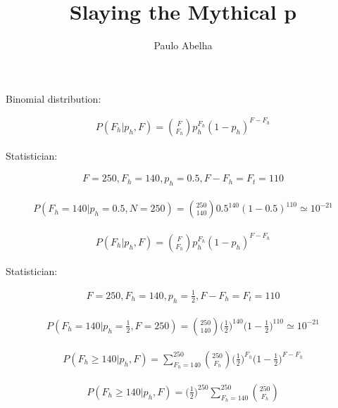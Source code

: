 \documentclass[12pt]{article}
\begin{document}
 

\pagecolor{blogger-black}
\color{white} 
 
\title{Slaying the Mythical p}
\author{Paulo Abelha}
\maketitle

Binomial distribution:

\begin{gather}
P(F_h | p_h, F) = \binom{F}{F_h}p_h^{F_h}(1-p_h)^{F-F_h}
\end{gather}

Statistician:

\begin{gather}
F = 250, F_h = 140, p_h = 0.5, F-F_h = F_t = 110
\end{gather}

\begin{gather}
P(F_h = 140 | p_h =0.5, N=250) = \binom{250}{140}0.5^{140}(1-0.5)^{110} \simeq 10^{-21}
\end{gather}


\begin{gather}
P(F_h | p_h, F) = \binom{F}{F_h}p_h^{F_h}(1-p_h)^{F-F_h}
\end{gather}

Statistician:

\begin{gather}
F = 250, F_h = 140, p_h = \frac{1}{2}, F-F_h = F_t = 110
\end{gather}

\begin{gather}
P(F_h = 140 | p_h =\frac{1}{2}, F=250) = \binom{250}{140}\Big(\frac{1}{2}\Big)^{140}\Big(1-\frac{1}{2}\Big)^{110} \simeq 10^{-21}
\end{gather}

\begin{gather}
P(F_h \geq 140 | p_h, F) = \sum_{F_h=140}^{250} \binom{250}{F_h}\Big(\frac{1}{2}\Big)^{F_h}\Big(1-\frac{1}{2}\Big)^{F-F_h}
\end{gather}

\begin{gather}
P(F_h \geq 140 | p_h, F) = \Big(\frac{1}{2}\Big)^{250} \sum_{F_h=140}^{250} \binom{250}{F_h}
\end{gather}
\end{document}
